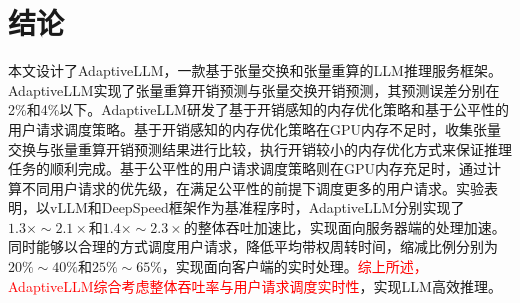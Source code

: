\section{结论}

本文设计了AdaptiveLLM，一款基于张量交换和张量重算的LLM推理服务框架。AdaptiveLLM实现了张量重算开销预测与张量交换开销预测，其预测误差分别在2\%和4\%以下。AdaptiveLLM研发了基于开销感知的内存优化策略和基于公平性的用户请求调度策略。基于开销感知的内存优化策略在GPU内存不足时，收集张量交换与张量重算开销预测结果进行比较，执行开销较小的内存优化方式来保证推理任务的顺利完成。基于公平性的用户请求调度策略则在GPU内存充足时，通过计算不同用户请求的优先级，在满足公平性的前提下调度更多的用户请求。实验表明，以vLLM和DeepSpeed框架作为基准程序时，AdaptiveLLM分别实现了$1.3\times\sim2.1\times$和$1.4\times\sim2.3\times$的整体吞吐加速比，实现面向服务器端的处理加速。同时能够以合理的方式调度用户请求，降低平均带权周转时间，缩减比例分别为$20\%\sim40\%$和$25\%\sim65\%$，实现面向客户端的实时处理。\textcolor{red}{综上所述，AdaptiveLLM综合考虑整体吞吐率与用户请求调度实时性}，实现LLM高效推理。